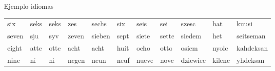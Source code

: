 \documentclass[spanish]{beamer}
\begin{document}
\begin{frame}{Ejemplo idiomas}
\begin{table}[h]
{\begin{tabular}{lllllllllll}
six                                                  & seks                                                  & seks                                                 & zes                                                     & sechs                                                & six                                                    & seis                                                   & sei                                                    & szesc                                                & hat                                                   & kuusi                                                \\
seven                                                & sju                                                   & syv                                                  & zeven                                                   & sieben                                               & sept                                                   & siete                                                  & sette                                                  & siedem                                               & het                                                   & seitseman                                            \\
eight                                                & atte                                                  & otte                                                 & acht                                                    & acht                                                 & huit                                                   & ocho                                                   & otto                                                   & osiem                                                & nyolc                                                 & kahdeksan                                            \\
nine                                                 & ni                                                    & ni                                                   & negen                                                   & neun                                                 & neuf                                                   & nueve                                                  & nove                                                   & dziewiec                                             & kilenc                                                & yhdeksan                                             \\

\end{tabular}}
\end{table}
\end{frame}
\end{document}
